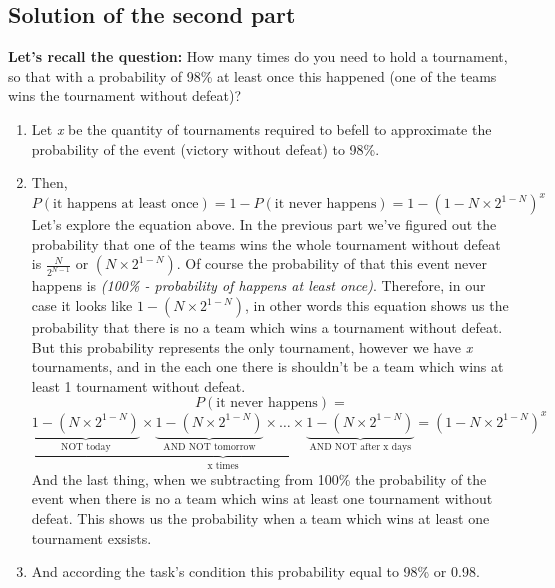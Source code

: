 \documentclass[14pt, a4paper]{extarticle}
\begin{document}
\subsection*{Solution of the second part}
\textbf{Let's recall the question:}
\newline
How many times do you need to hold a tournament, so that with a probability of 98\% at least once this happened (one of the teams wins the tournament without defeat)?

\begin{enumerate}
    \item Let \emph{x} be the quantity of tournaments required to befell to approximate the probability of the event (victory without defeat) to 98\%.
    \item Then,
    \[
        P(\text{it happens at least once}) = 1 - P(\text{it never happens}) =
        1 - (1 - N \times 2^{1-N})^x 
    \]
    Let's explore the equation above. In the previous part we've figured out the 
    probability that one of the teams wins the whole tournament without defeat 
    is \(\frac{N}{2^{N-1}}\) or \(\left( N \times 2^{1 - N} \right)\). Of course the 
    probability of that this event never happens is \emph{(100\% - probability of happens at least once)}.
    Therefore, in our case it looks like \(1 - \left( N \times 2^{1 - N} \right)\), in other words
    this equation shows us the probability that there is no a team which wins a tournament without defeat.
    But this probability represents the only tournament, however we have \emph{x} tournaments, and in the each one there 
    is shouldn't be a team which wins at least 1 tournament without defeat.
    \[
       P(\text{it never happens}) = 
    \]
    \[
        \underbrace{\underbrace{1 - \left( N \times 2^{1 - N} \right)}_\text{NOT today} 
        \times \underbrace{1 - \left( N \times 2^{1 - N} \right)}_\text{AND NOT tomorrow}
        \times \dots \times
        \underbrace{1 - \left( N \times 2^{1 - N} \right)}_\text{AND NOT after x days}}_\text{x times} =
        \left(1 - N \times 2^{1 - N}\right)^x
    \]
    And the last thing, when we subtracting from 100\% the probability of the event when there is no 
    a team which wins at least one tournament without defeat. This shows us the probability when a team 
    which wins at least one tournament exsists. 
    \item And according the task's condition this probability equal to 98\% or 0.98.
    \begin{itemize}

\end{itemize}
\end{enumerate}
\end{document}

